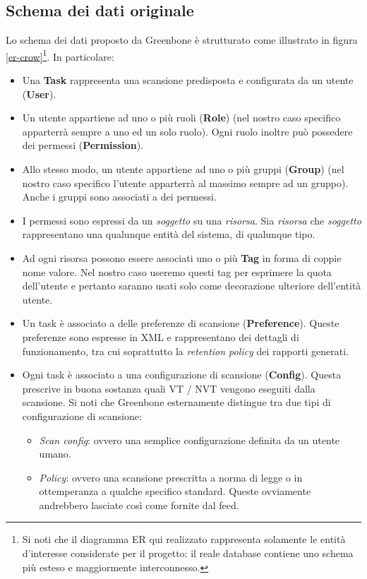 \subsection{Schema dei dati originale}
Lo schema dei dati proposto da Greenbone è strutturato come illustrato in figura \ref{er-crow}\footnote{Si noti che il diagramma ER qui realizzato rappresenta solamente le entità d'interesse considerate per il progetto: il reale database contiene uno schema più esteso e maggiormente interconnesso.}. In particolare:
\begin{itemize}
    \item Una \textbf{Task} rappresenta una scansione predisposta e configurata da un utente (\textbf{User}).
    \item Un utente appartiene ad uno o più ruoli (\textbf{Role}) (nel nostro caso specifico apparterrà sempre a uno ed un solo ruolo). Ogni ruolo inoltre può possedere dei permessi (\textbf{Permission}).
    \item Allo stesso modo, un utente appartiene ad uno o più gruppi (\textbf{Group}) (nel nostro caso specifico l'utente apparterrà al massimo sempre ad un gruppo). Anche i gruppi sono associati a dei permessi.
    \item I permessi sono espressi da un \emph{soggetto} su una \emph{risorsa}. Sia \emph{risorsa} che \emph{soggetto} rappresentano una qualunque entità del sistema, di qualunque tipo.
    \item Ad ogni risorsa possono essere associati uno o più \textbf{Tag} in forma di coppie nome valore. Nel nostro caso useremo questi tag per esprimere la quota dell'utente e pertanto saranno usati solo come decorazione ulteriore dell'entità utente.
    \item Un task è associato a delle preferenze di scansione (\textbf{Preference}). Queste preferenze sono espresse in XML e rappresentano dei dettagli di funzionamento, tra cui soprattutto la \emph{retention policy} dei rapporti generati.
    \item Ogni task è associato a una configurazione di scansione (\textbf{Config}). Questa prescrive in buona sostanza quali VT / NVT vengono eseguiti dalla scansione. Si noti che Greenbone esternamente distingue tra due tipi di configurazione di scansione:
    \begin{itemize}
        \item \emph{Scan config}: ovvero una semplice configurazione definita da un utente umano.
        \item \emph{Policy}: ovvero una scansione prescritta a norma di legge o in ottemperanza a qualche specifico standard. Queste ovviamente andrebbero lasciate così come fornite dal feed.

\end{itemize}
\end{itemize}
